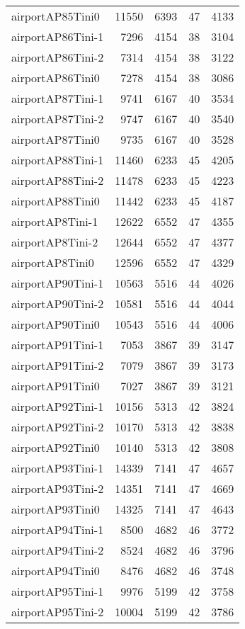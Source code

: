 \documentclass[../../../thesis.tex]{subfiles}
\begin{document}
\begin{longtable}{lrrrr}
airportAP85Tini0 & 11550 & 6393 & 47 & 4133 \\
airportAP86Tini-1 & 7296 & 4154 & 38 & 3104 \\
airportAP86Tini-2 & 7314 & 4154 & 38 & 3122 \\
airportAP86Tini0 & 7278 & 4154 & 38 & 3086 \\
airportAP87Tini-1 & 9741 & 6167 & 40 & 3534 \\
airportAP87Tini-2 & 9747 & 6167 & 40 & 3540 \\
airportAP87Tini0 & 9735 & 6167 & 40 & 3528 \\
airportAP88Tini-1 & 11460 & 6233 & 45 & 4205 \\
airportAP88Tini-2 & 11478 & 6233 & 45 & 4223 \\
airportAP88Tini0 & 11442 & 6233 & 45 & 4187 \\
airportAP8Tini-1 & 12622 & 6552 & 47 & 4355 \\
airportAP8Tini-2 & 12644 & 6552 & 47 & 4377 \\
airportAP8Tini0 & 12596 & 6552 & 47 & 4329 \\
airportAP90Tini-1 & 10563 & 5516 & 44 & 4026 \\
airportAP90Tini-2 & 10581 & 5516 & 44 & 4044 \\
airportAP90Tini0 & 10543 & 5516 & 44 & 4006 \\
airportAP91Tini-1 & 7053 & 3867 & 39 & 3147 \\
airportAP91Tini-2 & 7079 & 3867 & 39 & 3173 \\
airportAP91Tini0 & 7027 & 3867 & 39 & 3121 \\
airportAP92Tini-1 & 10156 & 5313 & 42 & 3824 \\
airportAP92Tini-2 & 10170 & 5313 & 42 & 3838 \\
airportAP92Tini0 & 10140 & 5313 & 42 & 3808 \\
airportAP93Tini-1 & 14339 & 7141 & 47 & 4657 \\
airportAP93Tini-2 & 14351 & 7141 & 47 & 4669 \\
airportAP93Tini0 & 14325 & 7141 & 47 & 4643 \\
airportAP94Tini-1 & 8500 & 4682 & 46 & 3772 \\
airportAP94Tini-2 & 8524 & 4682 & 46 & 3796 \\
airportAP94Tini0 & 8476 & 4682 & 46 & 3748 \\
airportAP95Tini-1 & 9976 & 5199 & 42 & 3758 \\
airportAP95Tini-2 & 10004 & 5199 & 42 & 3786 \\

\end{longtable}
\end{document}
